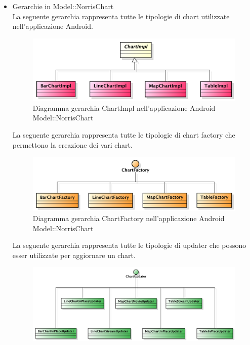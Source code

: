             \begin{itemize}
                \item Gerarchie in Model::NorrisChart \\
                    La seguente gerarchia rappresenta tutte le tipologie di chart utilizzate nell'applicazione Android.
                    \begin{figure}[H]
                        \centering
                        \includegraphics{DefinizioneDiProdotto/Pics/Gerarchie/ModelChartImpl.pdf}
                        \caption{Diagramma gerarchia ChartImpl nell'applicazione Android Model::NorrisChart }
                    \end{figure}
                    La seguente gerarchia rappresenta tutte le tipologie di chart factory che permettono la creazione dei vari chart.
                    \begin{figure}[H]
                        \centering
                        \includegraphics{DefinizioneDiProdotto/Pics/Gerarchie/ModelFactory.pdf}
                        \caption{Diagramma gerarchia ChartFactory nell'applicazione Android Model::NorrisChart}
                    \end{figure}
                    La seguente gerarchia rappresenta tutte le tipologie di updater che possono esser utilizzate per aggiornare un chart.
                    \begin{figure}[H]
                        \centering
                        \includegraphics{DefinizioneDiProdotto/Pics/Gerarchie/ModelUpdater.pdf}

\end{figure}
\end{itemize}
